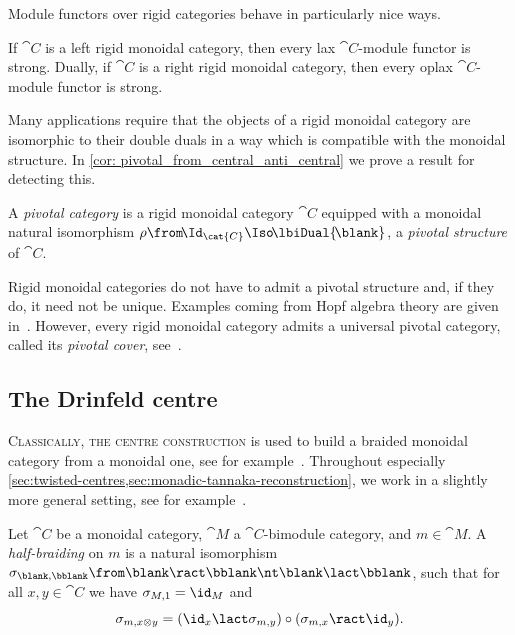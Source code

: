Module functors over rigid categories behave in particularly nice ways.

\begin{proposition}\label{prop:lax-is-strong-when-rigid}
  If \(\cat{C}\) is a left rigid monoidal category, then every lax \(\cat{C}\)\hyp{}module functor is strong.
  Dually, if \(\cat{C}\) is a right rigid monoidal category, then every oplax \(\cat{C}\)\hyp{}module functor is strong.
\end{proposition}

Many applications require that the objects of a rigid monoidal category are isomorphic to their double duals in a way which is compatible with the monoidal structure.
In \cref{cor: pivotal_from_central_anti_central} we prove a result for detecting this.

\begin{definition}\label{def: pivotal_category}
  A \emph{pivotal category} is a rigid monoidal category \(\cat{C}\) equipped with a monoidal natural isomorphism
  \(\rho\from\! \Id_{\cat{C}} \Iso\! \lbiDual{\!\blank}\),
  a \emph{pivotal structure} of \(\cat{C}\).
\end{definition}

Rigid monoidal categories do not have to admit a pivotal structure and, if they do, it need not be unique.
Examples coming from Hopf algebra theory are given in~\cite{Kauffman1993,Halbig2018,Halbig2019}.
However, every rigid monoidal category admits a universal pivotal category,
called its \emph{pivotal cover}, see~\cite{Shimizu2015}.

\subsection{The Drinfeld centre}\label{sec:drinfeld-centre}

\textsc{Classically, the centre construction} is used to build a braided monoidal category from a monoidal one,
see for example~\cite[Chapter~7]{Etingof2015}.
Throughout especially \cref{sec:twisted-centres,sec:monadic-tannaka-reconstruction},
we work in a slightly more general setting,
see for example~\cite{Gelaki2009,Bruguieres2012,Hassanzadeh2019,femić23:categ-yetter,kowalzig24:centr}.

\begin{definition}\label{def: half_braiding}
  Let \(\cat{C}\) be a monoidal category, \(\cat{M}\) a \(\cat{C}\)\hyp{}bimodule category, and \(m \in \cat{M}\).%
  A \emph{half-braiding} on \(m\) is a natural isomorphism
  \(\sigma_{\blank, \bblank} \from \blank \ract \bblank \nt \blank \lact \bblank\),
  such that for all \(x, y \in \cat{C}\) we have \(\sigma_{M, 1} = \id_M\) and
  \[
    \sigma_{m,x\otimes y} = ({\id_x} \lact \sigma_{m,y}) \circ (\sigma_{m, x} \ract \id_y).
  \]
\end{definition}

